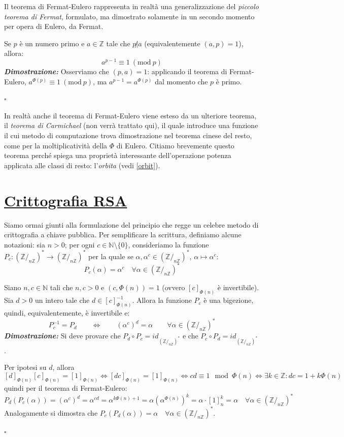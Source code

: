 \documentclass[oneside]{book}
\theoremstyle{remark}
\newcommand{\teorema}[1]{\section{\underline{#1}}}
\newcommand{\Mod}[1]{\ (\mathrm{mod}\ #1)} %
\newcommand{\cvd}{\begin{flushright}$\square$\end{flushright}} %
\begin{document}
Il teorema di Fermat-Eulero rappresenta in realtà una generalizzazione
del \textit{piccolo teorema di Fermat}, formulato, ma dimostrato solamente
in un secondo momento per opera di Eulero, da Fermat.

\begin{tcolorbox}[colback=green!30, colframe=green!30!black, title={Piccolo Teorema di Fermat}]
Se $p$ è un numero primo e $a\in\mathbb{Z}$ tale che $p\not|a$ (equivalentemente $(a,p)=1$), allora:
\[ a^{p-1} \equiv 1 \Mod{p} \]
\textit{\textbf{Dimostrazione:}} Osserviamo che $(p,a)=1$: applicando
il teorema di Fermat-Eulero, $a^{\Phi(p)} \equiv 1 \Mod{p}$, ma $a^{p-1} = a^{\Phi(p)}$
dal momento che $p$ è primo.
\cvd
\end{tcolorbox}
In realtà anche il teorema di Fermat-Eulero viene esteso da un ulteriore
teorema, il \textit{teorema di Carmichael} (non verrà trattato qui), il
quale introduce una funzione il cui metodo di computazione trova dimostrazione
nel teorema cinese del resto, come per la moltiplicatività della $\Phi$ di Eulero.
Citiamo brevemente questo teorema perché spiega una proprietà interessante
dell'operazione potenza applicata alle classi di resto: l'\textit{orbita}
(vedi \ref{orbit}).


\teorema{Crittografia RSA}
Siamo ormai giunti alla formulazione del principio che regge un celebre
metodo di crittografia a chiave pubblica. Per semplificare la scrittura,
definiamo alcune notazioni: sia $n>0$; per ogni $c\in\mathbb{N}\setminus\{0\}$, consideriamo
la funzione $ P_c: (\mathbb{Z}/_{n\mathbb{Z}})^* \to (\mathbb{Z}/_{n\mathbb{Z}})^* $
per la quale se $\alpha,\alpha^c\in(\mathbb{Z}/_{n\mathbb{Z}})^*$, $\alpha
\mapsto \alpha^c$: \[ P_c(\alpha)=\alpha^c \quad \forall \alpha \in (\mathbb{Z}/_{n\mathbb{Z}})^* \]

\begin{tcolorbox}[title={Crittografia RSA}]
Siano $n,c \in \mathbb{N}$ tali che $n,c>0$ e $(c,\Phi(n))=1$
(ovvero $[c]_{\Phi(n)}$ è invertibile). Sia $d>0$ un intero
tale che $d \in [c]_{\Phi(n)}^{-1}$. Allora la funzione $P_c$
è una bigezione, quindi, equivalentemente, è invertibile e:
\[ P_c^{-1} = P_d \qquad \Longleftrightarrow \qquad (\alpha^c)^d = \alpha \qquad \forall \alpha \in (\mathbb{Z}/_{n\mathbb{Z}})^* \]
\textit{\textbf{Dimostrazione:}}
Si deve provare che $P_d \circ P_c = id_{(\mathbb{Z}/_{n\mathbb{Z}})^*}$
e che $P_c \circ P_d = id_{(\mathbb{Z}/_{n\mathbb{Z}})^*}$.

Per ipotesi su $d$, allora
\[ [d]_{\Phi(n)}[c]_{\Phi(n)} = [1]_{\Phi(n)} \Longleftrightarrow [dc]_{\Phi(n)} = [1]_{\Phi(n)}
\Longleftrightarrow cd \equiv 1 \mod{\Phi(n)} \Longleftrightarrow \exists k \in \mathbb{Z}: dc = 1 + k\Phi(n) \]
quindi per il teorema di Fermat-Eulero:
\[ P_d(P_c(\alpha)) = (\alpha^c)^d = \alpha^{cd} = \alpha^{k\Phi(n)+1} = \alpha(\alpha^{\Phi(n)})^k = \alpha \cdot [1]_n^k = \alpha \quad \forall \alpha \in (\mathbb{Z}/_{n\mathbb{Z}})^*\]
Analogamente si dimostra che $P_c(P_d(\alpha)) = \alpha \quad \forall \alpha \in (\mathbb{Z}/_{n\mathbb{Z}})^*$.
\cvd
\end{tcolorbox}
\end{document}
